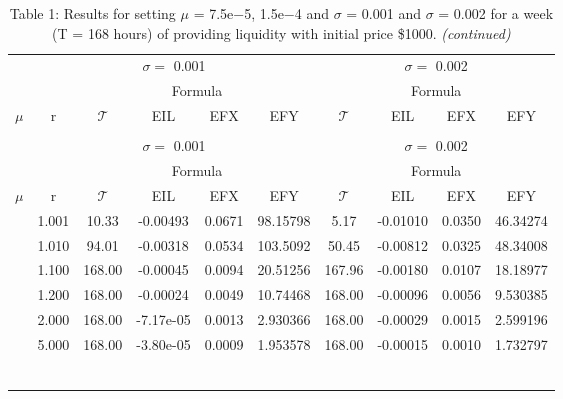 \documentclass[
]{article}
\begin{document}
\begin{longtable}[t]{>{}cccccccccc}
\caption{\label{tab:unnamed-chunk-2}Table 1: Results for setting $\mu$ = 7.5e−5, 1.5e−4 and $\sigma$ = 0.001 and $\sigma$ = 0.002 for a week (T = 168 hours) of providing liquidity with initial price \$1000.}\\
\toprule
\multicolumn{1}{c}{ } & \multicolumn{5}{c}{$\sigma = $ 0.001} & \multicolumn{4}{c}{$\sigma = $ 0.002} \\
\cmidrule(l{3pt}r{3pt}){2-6} \cmidrule(l{3pt}r{3pt}){7-10}
\multicolumn{1}{c}{ } & \multicolumn{1}{c}{ } & \multicolumn{4}{c}{Formula} & \multicolumn{4}{c}{Formula} \\
\cmidrule(l{3pt}r{3pt}){3-6} \cmidrule(l{3pt}r{3pt}){7-10}
$\mu$ & r & $\textstyle{\mathcal{T}}$ & EIL & EFX & EFY & $\textstyle{\mathcal{T}}$ & EIL & EFX & EFY\\
\midrule
\endfirsthead
\caption[]{Table 1: Results for setting $\mu$ = 7.5e−5, 1.5e−4 and $\sigma$ = 0.001 and $\sigma$ = 0.002 for a week (T = 168 hours) of providing liquidity with initial price \$1000. \textit{(continued)}}\\
\toprule
\multicolumn{1}{c}{ } & \multicolumn{5}{c}{$\sigma = $ 0.001} & \multicolumn{4}{c}{$\sigma = $ 0.002} \\
\cmidrule(l{3pt}r{3pt}){2-6} \cmidrule(l{3pt}r{3pt}){7-10}
\multicolumn{1}{c}{ } & \multicolumn{1}{c}{ } & \multicolumn{4}{c}{Formula} & \multicolumn{4}{c}{Formula} \\
\cmidrule(l{3pt}r{3pt}){3-6} \cmidrule(l{3pt}r{3pt}){7-10}
$\mu$ & r & $\textstyle{\mathcal{T}}$ & EIL & EFX & EFY & $\textstyle{\mathcal{T}}$ & EIL & EFX & EFY\\
\midrule
\endhead

\endfoot
\bottomrule
\endlastfoot
 & 1.001 & 10.33 & -0.00493 & 0.0671 & 98.15798 & 5.17 & -0.01010 & 0.0350 & 46.34274\\
\nopagebreak
 & 1.010 & 94.01 & -0.00318 & 0.0534 & 103.5092 & 50.45 & -0.00812 & 0.0325 & 48.34008\\
\nopagebreak
 & 1.100 & 168.00 & -0.00045 & 0.0094 & 20.51256 & 167.96 & -0.00180 & 0.0107 & 18.18977\\
\nopagebreak
 & 1.200 & 168.00 & -0.00024 & 0.0049 & 10.74468 & 168.00 & -0.00096 & 0.0056 & 9.530385\\
\nopagebreak
 & 2.000 & 168.00 & -7.17e-05 & 0.0013 & 2.930366 & 168.00 & -0.00029 & 0.0015 & 2.599196\\
\nopagebreak
\multirow{-6}{*}{\centering\arraybackslash 7.50e-05} & 5.000 & 168.00 & -3.80e-05 & 0.0009 & 1.953578 & 168.00 & -0.00015 & 0.0010 & 1.732797\\
\cmidrule{1-10}\pagebreak[0]
 &  &  &  &  &  &  &  &  \vphantom{5} & \\
\nopagebreak
 &  &  &  &  &  &  &  &  \vphantom{4} & \\
\nopagebreak
 &  &  &  &  &  &  &  &  \vphantom{3} & \\
\nopagebreak
 &  &  &  &  &  &  &  &  \vphantom{2} & \\
\nopagebreak
 &  &  &  &  &  &  &  &  \vphantom{1} & \\
\nopagebreak
\multirow{-6}{*}{\centering\arraybackslash } &  &  &  &  &  &  &  &  & \\*
\end{longtable}
\end{document}
